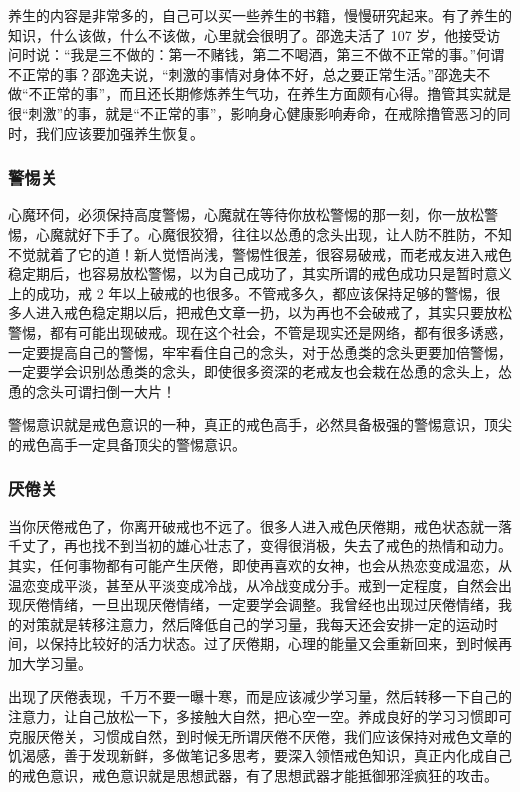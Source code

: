 养生的内容是非常多的，自己可以买一些养生的书籍，慢慢研究起来。有了养生的知识，什么该做，什么不该做，心里就会很明了。邵逸夫活了 107 岁，他接受访问时说：“我是三不做的：第一不赌钱，第二不喝酒，第三不做不正常的事。”何谓不正常的事？邵逸夫说，“刺激的事情对身体不好，总之要正常生活。”邵逸夫不做“不正常的事”，而且还长期修炼养生气功，在养生方面颇有心得。撸管其实就是很“刺激”的事，就是“不正常的事”，影响身心健康影响寿命，在戒除撸管恶习的同时，我们应该要加强养生恢复。

\subsubsection{警惕关}

心魔环伺，必须保持高度警惕，心魔就在等待你放松警惕的那一刻，你一放松警惕，心魔就好下手了。心魔很狡猾，往往以怂恿的念头出现，让人防不胜防，不知不觉就着了它的道！新人觉悟尚浅，警惕性很差，很容易破戒，而老戒友进入戒色稳定期后，也容易放松警惕，以为自己成功了，其实所谓的戒色成功只是暂时意义上的成功，戒 2 年以上破戒的也很多。不管戒多久，都应该保持足够的警惕，很多人进入戒色稳定期以后，把戒色文章一扔，以为再也不会破戒了，其实只要放松警惕，都有可能出现破戒。现在这个社会，不管是现实还是网络，都有很多诱惑，一定要提高自己的警惕，牢牢看住自己的念头，对于怂恿类的念头更要加倍警惕，一定要学会识别怂恿类的念头，即使很多资深的老戒友也会栽在怂恿的念头上，怂恿的念头可谓扫倒一大片！

警惕意识就是戒色意识的一种，真正的戒色高手，必然具备极强的警惕意识，顶尖的戒色高手一定具备顶尖的警惕意识。

\subsubsection{厌倦关}

当你厌倦戒色了，你离开破戒也不远了。很多人进入戒色厌倦期，戒色状态就一落千丈了，再也找不到当初的雄心壮志了，变得很消极，失去了戒色的热情和动力。其实，任何事物都有可能产生厌倦，即使再喜欢的女神，也会从热恋变成温恋，从温恋变成平淡，甚至从平淡变成冷战，从冷战变成分手。戒到一定程度，自然会出现厌倦情绪，一旦出现厌倦情绪，一定要学会调整。我曾经也出现过厌倦情绪，我的对策就是转移注意力，然后降低自己的学习量，我每天还会安排一定的运动时间，以保持比较好的活力状态。过了厌倦期，心理的能量又会重新回来，到时候再加大学习量。

出现了厌倦表现，千万不要一曝十寒，而是应该减少学习量，然后转移一下自己的注意力，让自己放松一下，多接触大自然，把心空一空。养成良好的学习习惯即可克服厌倦关，习惯成自然，到时候无所谓厌倦不厌倦，我们应该保持对戒色文章的饥渴感，善于发现新鲜，多做笔记多思考，要深入领悟戒色知识，真正内化成自己的戒色意识，戒色意识就是思想武器，有了思想武器才能抵御邪淫疯狂的攻击。

